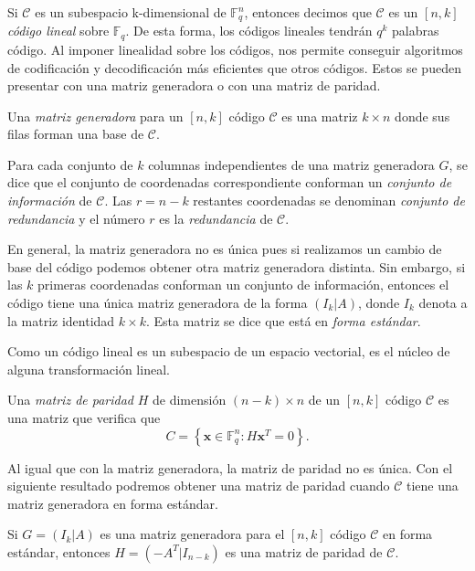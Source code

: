 Si $\mathcal{C}$ es un subespacio k-dimensional de $\mathbb{F}_q^n$, entonces decimos que $\mathcal{C}$ es un $\left[ n, k \right]$ \emph{código lineal} sobre $\mathbb{F}_q$. De esta forma, los códigos lineales tendrán $q^k$ palabras código. Al imponer linealidad sobre los códigos, nos permite conseguir algoritmos de codificación y decodificación más eficientes que otros códigos. Estos se pueden presentar con una matriz generadora o con una matriz de paridad.

\begin{definition}
    Una \emph{matriz generadora} para un $\left[ n,k \right]$ código $\mathcal{C}$ es una matriz $k \times n$ donde sus filas forman una base de $\mathcal{C}$.
\end{definition}

\begin{definition}
    Para cada conjunto de $k$ columnas independientes de una matriz generadora $G$, se dice que el conjunto de coordenadas correspondiente conforman un \emph{conjunto de información} de $\mathcal{C}$. Las $r = n-k$ restantes coordenadas se denominan \emph{conjunto de redundancia} y el número $r$ es la \emph{redundancia} de $\mathcal{C}$.
\end{definition}

En general, la matriz generadora no es única pues si realizamos un cambio de base del código podemos obtener otra matriz generadora distinta. Sin embargo, si las $k$ primeras coordenadas conforman un conjunto de información, entonces el código tiene una única matriz generadora de la forma $( I_k | A)$, donde $I_k$ denota a la matriz identidad $k \times k$. Esta matriz se dice que está en \emph{forma estándar}.

Como un código lineal es un subespacio de un espacio vectorial, es el núcleo de alguna transformación lineal.

\begin{definition}
    Una \emph{matriz de paridad} $H$ de dimensión $(n-k) \times n$ de un $\left[ n,k \right]$ código $\mathcal{C}$ es una matriz que verifica que
    \[
        C = \left\lbrace \mathbf{x} \in \mathbb{F} _q^n : H\mathbf{x}^T = 0 \right\rbrace .
    \]
\end{definition}

Al igual que con la matriz generadora, la matriz de paridad no es única. Con el siguiente resultado podremos obtener una matriz de paridad cuando $\mathcal{C}$ tiene una matriz generadora en forma estándar.

\begin{theorem}
    \label{th:generadora-paridad}
    Si $G = \left( I_k | A \right)$ es una matriz generadora para el $\left[ n,k \right]$ código $\mathcal{C}$ en forma estándar, entonces $H = \left( -A^T | I_{n-k} \right)$ es una matriz de paridad de $\mathcal{C}$.
\end{theorem}

